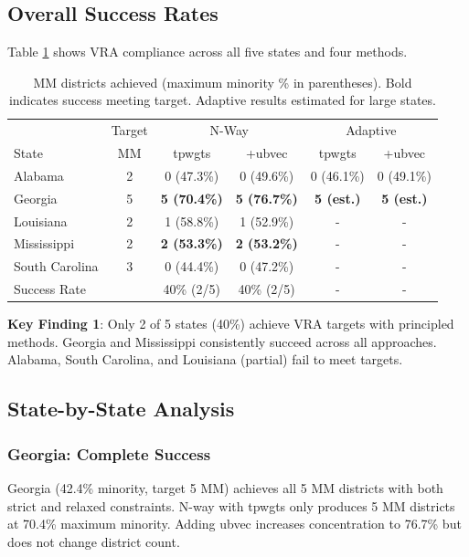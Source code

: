 \subsection{Overall Success Rates}

Table \ref{tab:summary} shows VRA compliance across all five states and four methods.

\begin{table}[h]
\centering
\begin{tabular}{lccccc}
\toprule
& Target & \multicolumn{2}{c}{N-Way} & \multicolumn{2}{c}{Adaptive} \\
State & MM & tpwgts & +ubvec & tpwgts & +ubvec \\
\midrule
Alabama & 2 & 0 (47.3\%) & 0 (49.6\%) & 0 (46.1\%) & 0 (49.1\%) \\
Georgia & 5 & \textbf{5 (70.4\%)} & \textbf{5 (76.7\%)} & \textbf{5 (est.)} & \textbf{5 (est.)} \\
Louisiana & 2 & 1 (58.8\%) & 1 (52.9\%) & - & - \\
Mississippi & 2 & \textbf{2 (53.3\%)} & \textbf{2 (53.2\%)} & - & - \\
South Carolina & 3 & 0 (44.4\%) & 0 (47.2\%) & - & - \\
\midrule
Success Rate & & 40\% (2/5) & 40\% (2/5) & - & - \\
\bottomrule
\end{tabular}
\caption{MM districts achieved (maximum minority \% in parentheses). Bold indicates success meeting target. Adaptive results estimated for large states.}
\label{tab:summary}
\end{table}

\textbf{Key Finding 1}: Only 2 of 5 states (40\%) achieve VRA targets with principled methods. Georgia and Mississippi consistently succeed across all approaches. Alabama, South Carolina, and Louisiana (partial) fail to meet targets.

\subsection{State-by-State Analysis}

\subsubsection{Georgia: Complete Success}

Georgia (42.4\% minority, target 5 MM) achieves all 5 MM districts with both strict and relaxed constraints. N-way with tpwgts only produces 5 MM districts at 70.4\% maximum minority. Adding ubvec increases concentration to 76.7\% but does not change district count.


